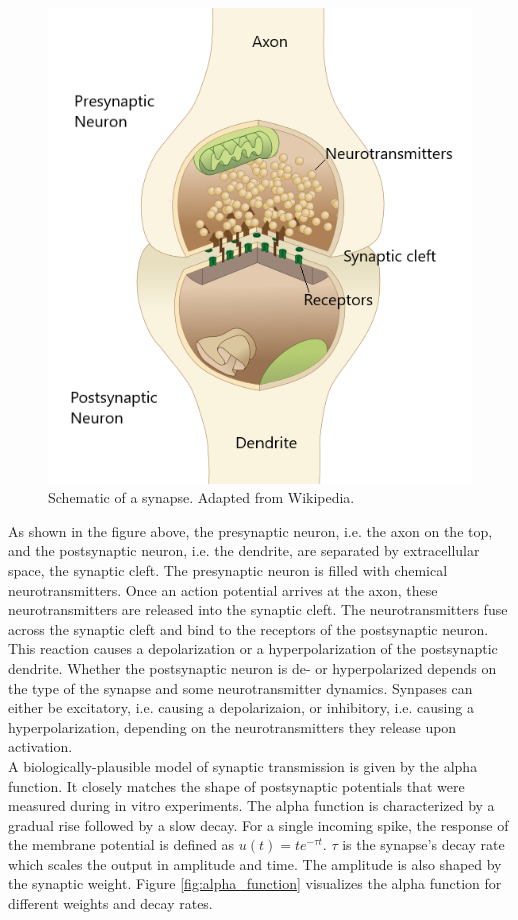 \begin{figure}
    \centering
    \includegraphics[width=0.8\linewidth]{Figures/Synapse.png}
    \caption{Schematic of a synapse. Adapted from Wikipedia.}
    \label{fig:synapse}
\end{figure}

As shown in the figure above, the presynaptic neuron, i.e. the axon on the top, and the postsynaptic neuron, i.e. the dendrite, are separated by extracellular space, the synaptic cleft. The presynaptic neuron is filled with chemical neurotransmitters. Once an action potential arrives at the axon, these neurotransmitters are released into the synaptic cleft. The neurotransmitters fuse across the synaptic cleft and bind to the receptors of the postsynaptic neuron. This reaction causes a depolarization or a hyperpolarization of the postsynaptic dendrite. Whether the postsynaptic neuron is de- or hyperpolarized depends on the type of the synapse and some neurotransmitter dynamics. Synpases can either be excitatory, i.e. causing a depolarizaion, or inhibitory, i.e. causing a hyperpolarization, depending on the neurotransmitters they release upon activation.\\

A biologically-plausible model of synaptic transmission is given by the alpha function. It closely matches the shape of postsynaptic potentials that were measured during in vitro experiments. The alpha function is characterized by a gradual rise followed by a slow decay. For a single incoming spike, the response of the membrane potential is defined as $u(t) = te^{-\tau t}$. $\tau$ is the synapse's decay rate which scales the output in amplitude and time. The amplitude is also shaped by the synaptic weight. Figure \ref{fig:alpha_function} visualizes the alpha function for different weights and decay rates.

